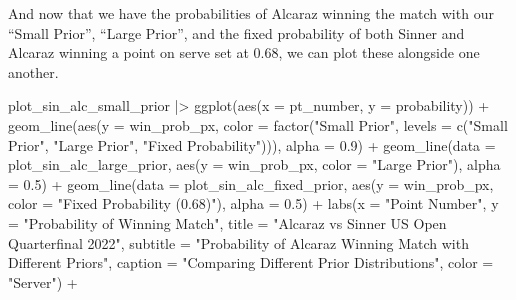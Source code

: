 \documentclass[
  letterpaper,
  DIV=11,
  numbers=noendperiod]{scrartcl}
\newenvironment{Shaded}{\begin{snugshade}}{\end{snugshade}}
\newcommand{\AttributeTok}[1]{\textcolor[rgb]{0.40,0.45,0.13}{#1}}
\newcommand{\FloatTok}[1]{\textcolor[rgb]{0.68,0.00,0.00}{#1}}
\newcommand{\FunctionTok}[1]{\textcolor[rgb]{0.28,0.35,0.67}{#1}}
\newcommand{\NormalTok}[1]{\textcolor[rgb]{0.00,0.23,0.31}{#1}}
\newcommand{\SpecialCharTok}[1]{\textcolor[rgb]{0.37,0.37,0.37}{#1}}
\newcommand{\StringTok}[1]{\textcolor[rgb]{0.13,0.47,0.30}{#1}}
\begin{document}
\linespread{2}

And now that we have the probabilities of Alcaraz winning the match with
our ``Small Prior'', ``Large Prior'', and the fixed probability of both
Sinner and Alcaraz winning a point on serve set at 0.68, we can plot
these alongside one another.

\linespread{0.9}

\begin{Shaded}
\begin{Highlighting}[]
\NormalTok{plot\_sin\_alc\_small\_prior }\SpecialCharTok{|\textgreater{}} \FunctionTok{ggplot}\NormalTok{(}\FunctionTok{aes}\NormalTok{(}\AttributeTok{x =}\NormalTok{ pt\_number, }\AttributeTok{y =}\NormalTok{ probability)) }\SpecialCharTok{+}
  \FunctionTok{geom\_line}\NormalTok{(}\FunctionTok{aes}\NormalTok{(}\AttributeTok{y =}\NormalTok{ win\_prob\_px, }
                \AttributeTok{color =} \FunctionTok{factor}\NormalTok{(}\StringTok{"Small Prior"}\NormalTok{, }
                               \AttributeTok{levels =} \FunctionTok{c}\NormalTok{(}\StringTok{"Small Prior"}\NormalTok{, }
                                          \StringTok{"Large Prior"}\NormalTok{, }
                                          \StringTok{"Fixed Probability"}\NormalTok{))), }
                \AttributeTok{alpha =} \FloatTok{0.9}\NormalTok{) }\SpecialCharTok{+}
  \FunctionTok{geom\_line}\NormalTok{(}\AttributeTok{data =}\NormalTok{ plot\_sin\_alc\_large\_prior, }
            \FunctionTok{aes}\NormalTok{(}\AttributeTok{y =}\NormalTok{ win\_prob\_px, }\AttributeTok{color =} \StringTok{"Large Prior"}\NormalTok{), }\AttributeTok{alpha =} \FloatTok{0.5}\NormalTok{) }\SpecialCharTok{+}
  \FunctionTok{geom\_line}\NormalTok{(}\AttributeTok{data =}\NormalTok{ plot\_sin\_alc\_fixed\_prior, }
            \FunctionTok{aes}\NormalTok{(}\AttributeTok{y =}\NormalTok{ win\_prob\_px, }
                \AttributeTok{color =} \StringTok{"Fixed Probability (0.68)"}\NormalTok{), }
            \AttributeTok{alpha =} \FloatTok{0.5}\NormalTok{) }\SpecialCharTok{+}
  \FunctionTok{labs}\NormalTok{(}\AttributeTok{x =} \StringTok{"Point Number"}\NormalTok{,}
       \AttributeTok{y =} \StringTok{"Probability of Winning Match"}\NormalTok{,}
       \AttributeTok{title =} \StringTok{"Alcaraz vs Sinner US Open Quarterfinal 2022"}\NormalTok{,}
       \AttributeTok{subtitle =} \StringTok{"Probability of Alcaraz Winning Match with Different Priors"}\NormalTok{,}
       \AttributeTok{caption =} \StringTok{"Comparing Different Prior Distributions"}\NormalTok{,}
       \AttributeTok{color =} \StringTok{"Server"}\NormalTok{) }\SpecialCharTok{+}

\end{Highlighting}
\end{Shaded}
\end{document}
